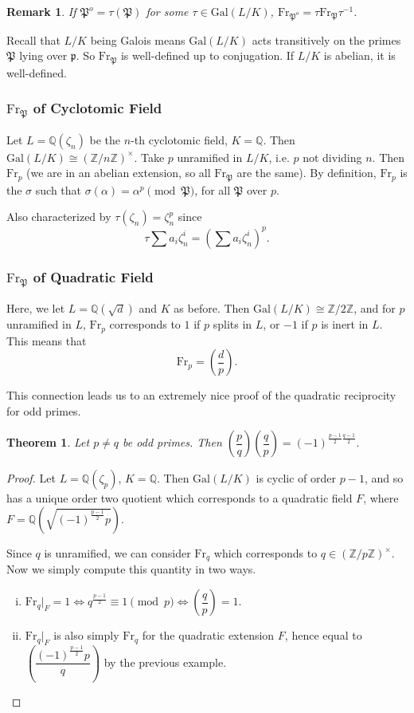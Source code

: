 \documentclass[letterpaper, 12pt]{article}
\newtheorem{rmk}{Remark}
\newtheorem{thm}{Theorem}[subsection]
\newcommand{\gal}[3]{\mathrm{Gal}(#1 #2 #3)}
\newcommand{\iso}{\cong}
\newcommand{\rats}{\mathbb{Q}}
\renewcommand{\prime}{\mathfrak{p}}
\newcommand{\oprime}{\mathfrak{P}}
\newcommand{\oprimealt}{\oprime^o}
\newcommand{\frob}[1]{\mathrm{Fr}_{#1}}
\newcommand{\legndr}[2]{\left(\dfrac{#1}{#2}\right)}
\newcommand{\Z}[1]{\mathbb{Z}/#1 \mathbb{Z}}
\newcommand{\Znu}{\left(\mathbb{Z}/n\mathbb{Z}\right)^\times}
\newcommand{\Zpu}{\left(\mathbb{Z}/p\mathbb{Z}\right)^\times}
\begin{document}
\begin{rmk}
If $\oprimealt = \tau(\oprime)$ for some $\tau \in \gal L/K$, $\frob \oprimealt = \tau \frob \oprime \tau^{-1}$.
\end{rmk}

Recall that $L/K$ being Galois means $\gal L/K$ acts transitively on the primes $\oprime$ lying over $\prime$. So $\frob \oprime$ is well-defined up to conjugation. If $L/K$ is abelian, it is well-defined. 

\subsubsection{$\frob \oprime$ of Cyclotomic Field}
Let $L = \rats(\zeta_n)$ be the $n$-th cyclotomic field, $K = \rats$. Then $\gal L/K \iso \Znu$. Take $p$ unramified in $L/K$, i.e. $p$ not dividing $n$. Then $\frob p$ (we are in an abelian extension, so all $\frob \oprime$ are the same). By definition, $\frob p$ is the $\sigma$ such that $\sigma(\alpha) = \alpha^p \pmod \oprime$, for all $\oprime$ over $p$. 

Also characterized by $\tau(\zeta_n) = \zeta_n^p$ since \[\tau \sum a_i \zeta_n^i = (\sum a_i \zeta_n^i)^p.\]

\subsubsection{$\frob \oprime$ of Quadratic Field}
Here, we let $L = \rats(\sqrt{d})$ and $K$ as before. Then $\gal L/K \iso \Z 2$, and for $p$ unramified in $L$, $\frob p$ corresponds to $1$ if $p$ splits in $L$, or $-1$ if $p$ is inert in $L$. This means that \[\frob p = \legndr d p.\]

This connection leads us to an extremely nice proof of the quadratic reciprocity for odd primes.
\begin{thm}
Let $p \neq q$ be odd primes. Then $\legndr p q \legndr q p = (-1)^{\frac{p - 1}{2} \frac{q - 1}{2}}.$
\end{thm}
\begin{proof}
Let $L = \rats(\zeta_p)$, $K = \rats$. Then $\gal L/K$ is cyclic of order $p - 1$, and so has a unique order two quotient which corresponds to a quadratic field $F$, where $F = \rats\left(\sqrt{(-1)^{\frac{p - 1}{2}}p}\right)$.

Since $q$ is unramified, we can consider $\frob q$ which corresponds to $q \in \Zpu$. Now we simply compute this quantity in two ways.
\begin{enumerate}[(i)]
\item $\frob q \rvert_F = 1 \Leftrightarrow q^{\frac{p - 1}{2}} \equiv 1 \pmod p \Leftrightarrow \legndr q p = 1$.
\item $\frob q \rvert_F$ is also simply $\frob q$ for the quadratic extension $F$, hence equal to $\legndr{(-1)^{\frac{p - 1}{2}} p}{q}$ by the previous example.
\end{enumerate}
\end{proof}
\end{document}
